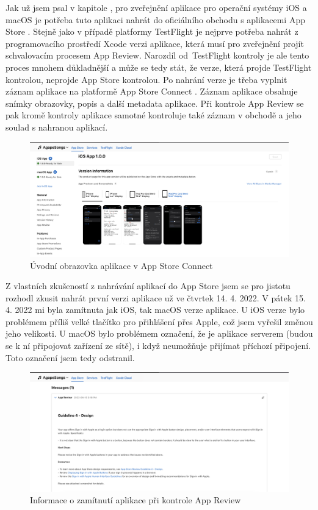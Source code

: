 Jak už jsem psal v kapitole , pro zveřejnění aplikace pro operační systémy iOS a macOS je potřeba tuto aplikaci nahrát do oficiálního obchodu s aplikacemi App Store \cite{app-store}. Stejně jako v případě platformy TestFlight je nejprve potřeba nahrát z programovacího prostředí Xcode verzi aplikace, která musí pro zveřejnění projít schvalovacím procesem App Review. Narozdíl od~TestFlight kontroly je ale tento proces mnohem důkladnější a může se tedy stát, že verze, která projde TestFlight kontrolou, neprojde App Store kontrolou. Po nahrání verze je třeba vyplnit záznam aplikace na platformě App Store Connect \cite{app-store-connect}. Záznam aplikace obsahuje snímky obrazovky, popis a další metadata aplikace. Při kontrole App Review se pak kromě kontroly aplikace samotné kontroluje také záznam v obchodě a jeho soulad s nahranou aplikací.

\begin{figure}
    \includegraphics[width=\textwidth]{images/7-nasazeni/7-3-appstore.png}
    \caption{Úvodní obrazovka aplikace v App Store Connect}
\end{figure}

Z vlastních zkušeností z nahrávání aplikací do App Store jsem se pro jistotu rozhodl zkusit nahrát první verzi aplikace už ve čtvrtek 14. 4. 2022. V pátek 15. 4. 2022 mi byla zamítnuta jak iOS, tak macOS verze aplikace. U iOS verze bylo problémem příliš velké tlačítko pro přihlášení přes Apple, což jsem vyřešil změnou jeho velikosti. U macOS bylo problémem označení, že je aplikace serverem (budou se k ní připojovat zařízení ze sítě), i když neumožňuje přijímat příchozí připojení. Toto označení jsem tedy odstranil.

\begin{figure}[H]
    \includegraphics[width=\textwidth]{images/7-nasazeni/7-4-appstore-zamitnuti.png}
    \caption{Informace o zamítnutí aplikace při kontrole App Review}
\end{figure}

